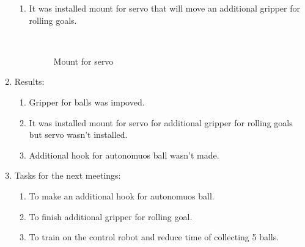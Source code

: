 \begin{enumerate}
\begin{enumerate}
		\item It was installed mount for servo that will move an additional gripper for rolling goals.
        \begin{figure}[H]
	  	  \begin{minipage}[h]{0.2\linewidth}
	  	    \center  
	  	  \end{minipage}
	  	  \begin{minipage}[h]{0.6\linewidth}
	  		\caption{Mount for servo}
	  	  \end{minipage}
	    \end{figure}

	\end{enumerate}
	
	\item Results:
	\begin{enumerate}
		
		\item Gripper for balls was impoved.
		
		\item It was installed mount for servo for additional gripper for rolling goals but servo wasn't installed.
		
        \item Additional hook for autonomuos ball wasn't made.
		
	\end{enumerate}
	
	\item Tasks for the next meetings:
	\begin{enumerate}
		
		\item To make an additional hook for autonomuos ball.
		
		\item To finish additional gripper for rolling goal.
		
		\item To train on the control robot and reduce time of collecting 5 balls.
			
	\end{enumerate}
\end{enumerate}
\fillpage
